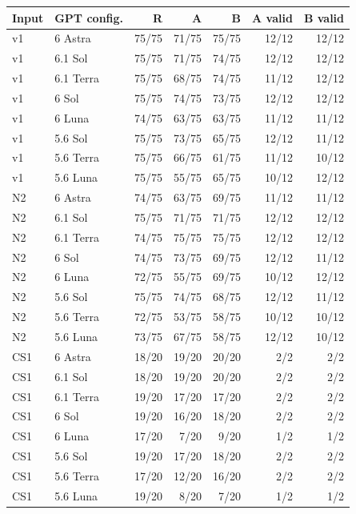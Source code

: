 \begin{tabular}{llrrrrr}
\toprule
Input & GPT config. & R & A & B & A valid & B valid \\
\midrule
v1 & 6 Astra & 75/75 & 71/75 & 75/75 & 12/12 & 12/12 \\
v1 & 6.1 Sol & 75/75 & 71/75 & 74/75 & 12/12 & 12/12 \\
v1 & 6.1 Terra & 75/75 & 68/75 & 74/75 & 11/12 & 12/12 \\
v1 & 6 Sol & 75/75 & 74/75 & 73/75 & 12/12 & 12/12 \\
v1 & 6 Luna & 74/75 & 63/75 & 63/75 & 11/12 & 11/12 \\
v1 & 5.6 Sol & 75/75 & 73/75 & 65/75 & 12/12 & 11/12 \\
v1 & 5.6 Terra & 75/75 & 66/75 & 61/75 & 11/12 & 10/12 \\
v1 & 5.6 Luna & 75/75 & 55/75 & 65/75 & 10/12 & 12/12 \\
N2 & 6 Astra & 74/75 & 63/75 & 69/75 & 11/12 & 11/12 \\
N2 & 6.1 Sol & 75/75 & 71/75 & 71/75 & 12/12 & 12/12 \\
N2 & 6.1 Terra & 74/75 & 75/75 & 75/75 & 12/12 & 12/12 \\
N2 & 6 Sol & 74/75 & 73/75 & 69/75 & 12/12 & 11/12 \\
N2 & 6 Luna & 72/75 & 55/75 & 69/75 & 10/12 & 12/12 \\
N2 & 5.6 Sol & 75/75 & 74/75 & 68/75 & 12/12 & 11/12 \\
N2 & 5.6 Terra & 72/75 & 53/75 & 58/75 & 10/12 & 10/12 \\
N2 & 5.6 Luna & 73/75 & 67/75 & 58/75 & 12/12 & 10/12 \\
CS1 & 6 Astra & 18/20 & 19/20 & 20/20 & 2/2 & 2/2 \\
CS1 & 6.1 Sol & 18/20 & 19/20 & 20/20 & 2/2 & 2/2 \\
CS1 & 6.1 Terra & 19/20 & 17/20 & 17/20 & 2/2 & 2/2 \\
CS1 & 6 Sol & 19/20 & 16/20 & 18/20 & 2/2 & 2/2 \\
CS1 & 6 Luna & 17/20 & 7/20 & 9/20 & 1/2 & 1/2 \\
CS1 & 5.6 Sol & 19/20 & 17/20 & 18/20 & 2/2 & 2/2 \\
CS1 & 5.6 Terra & 17/20 & 12/20 & 16/20 & 2/2 & 2/2 \\
CS1 & 5.6 Luna & 19/20 & 8/20 & 7/20 & 1/2 & 1/2 \\
\bottomrule
\end{tabular}
